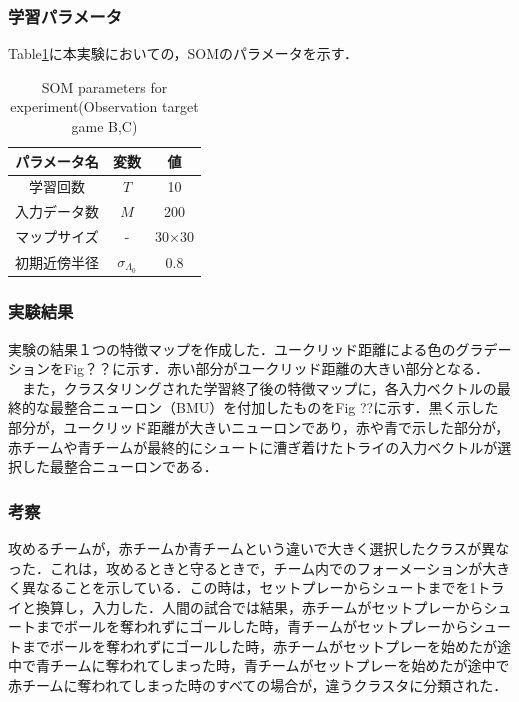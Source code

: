  \subsubsection{学習パラメータ}
 Table\ref{table5}に本実験においての，SOMのパラメータを示す．
 
\begin{table}[htb]
	\begin{center}
	\caption{SOM parameters for experiment(Observation target game B,C)}
	\begin{tabular}{|c|c|c|}\hline
		\label{table5}
	 	パラメータ名 & 変数 & 値  \\ \hline \hline
	 	学習回数 & $T$ & 10  \\
   	 	入力データ数 & $M$ & 200 \\
		マップサイズ & - &30×30\\
   		初期近傍半径 & $\sigma_{\Lambda_0}$ & 0.8 \\ \hline
	\end{tabular}
	\end{center}
\end{table}

\subsubsection{実験結果}
実験の結果１つの特徴マップを作成した．ユークリッド距離による色のグラデーションをFig？？に示す．赤い部分がユークリッド距離の大きい部分となる．\\
　また，クラスタリングされた学習終了後の特徴マップに，各入力ベクトルの最終的な最整合ニューロン（BMU）を付加したものをFig ??に示す．黒く示した部分が，ユークリッド距離が大きいニューロンであり，赤や青で示した部分が，赤チームや青チームが最終的にシュートに漕ぎ着けたトライの入力ベクトルが選択した最整合ニューロンである．

\subsubsection{考察}
攻めるチームが，赤チームか青チームという違いで大きく選択したクラスが異なった．これは，攻めるときと守るときで，チーム内でのフォーメーションが大きく異なることを示している．この時は，セットプレーからシュートまでを1トライと換算し，入力した．人間の試合では結果，赤チームがセットプレーからシュートまでボールを奪われずにゴールした時，青チームがセットプレーからシュートまでボールを奪われずにゴールした時，赤チームがセットプレーを始めたが途中で青チームに奪われてしまった時，青チームがセットプレーを始めたが途中で赤チームに奪われてしまった時のすべての場合が，違うクラスタに分類された．

